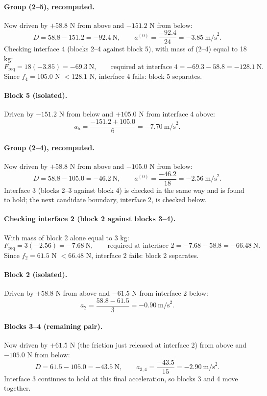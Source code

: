 \documentclass[11pt,a4paper]{article}
\begin{document}
\paragraph{Group (2--5), recomputed.} Now driven by $+58.8$ N from above and $-151.2$ N from below:
\[
D = 58.8 - 151.2 = -92.4\ \text{N}, \qquad a^{(0)} = \frac{-92.4}{24} = -3.85\ \text{m/s}^2 .
\]
Checking interface 4 (blocks 2--4 against block 5), with mass of (2--4) equal to 18 kg:
\[
F_{\mathrm{req}} = 18(-3.85) = -69.3\ \text{N}, \qquad \text{required at interface 4} = -69.3 - 58.8 = -128.1\ \text{N}.
\]
Since $f_4 = 105.0$ N $< 128.1$ N, interface 4 fails: block 5 separates.

\paragraph{Block 5 (isolated).} Driven by $-151.2$ N from below and $+105.0$ N from interface 4 above:
\[
a_5 = \frac{-151.2+105.0}{6} = -7.70\ \text{m/s}^2 .
\]

\paragraph{Group (2--4), recomputed.} Now driven by $+58.8$ N from above and $-105.0$ N from below:
\[
D = 58.8 - 105.0 = -46.2\ \text{N}, \qquad a^{(0)} = \frac{-46.2}{18} = -2.56\ \text{m/s}^2 .
\]
Interface 3 (blocks 2--3 against block 4) is checked in the same way and is found to hold; the next candidate boundary, interface 2, is checked below.

\paragraph{Checking interface 2 (block 2 against blocks 3--4).} With mass of block 2 alone equal to 3 kg:
\[
F_{\mathrm{req}} = 3(-2.56) = -7.68\ \text{N}, \qquad \text{required at interface 2} = -7.68 - 58.8 = -66.48\ \text{N}.
\]
Since $f_2 = 61.5$ N $< 66.48$ N, interface 2 fails: block 2 separates.

\paragraph{Block 2 (isolated).} Driven by $+58.8$ N from above and $-61.5$ N from interface 2 below:
\[
a_2 = \frac{58.8-61.5}{3} = -0.90\ \text{m/s}^2 .
\]

\paragraph{Blocks 3--4 (remaining pair).} Now driven by $+61.5$ N (the friction just released at interface 2) from above and $-105.0$ N from below:
\[
D = 61.5-105.0 = -43.5\ \text{N}, \qquad a_{3,4} = \frac{-43.5}{15} = -2.90\ \text{m/s}^2 .
\]
Interface 3 continues to hold at this final acceleration, so blocks 3 and 4 move together.
\end{document}
